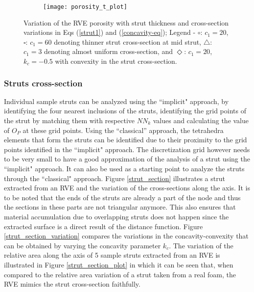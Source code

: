 \begin{figure}
	\centering
	\begin{subfigure}[b]{0.5\textwidth}
		\texttt{[image: porosity\_t\_plot]}
	\end{subfigure}
	\caption{Variation of the RVE porosity with strut thickness and cross-section variations in Eqs (\ref{strut1}) and (\ref{concavity-eq}); Legend - $ \circ $: $ c_1=20 $, $ \square $: $ c_1 = 60 $ denoting thinner strut cross-section at mid strut, $ \triangle $: $c_1 = 3$ denoting almost uniform cross-section, and $ \Diamond $: $ c_1 = 20 $, $ k_c=-0.5 $ with convexity in the strut cross-section.}\label{density_t}
\end{figure}

\subsubsection{Struts cross-section}
Individual sample struts can be analyzed using the ``implicit" approach, by identifying the four nearest inclusions of the struts, identifying the grid points of the strut by matching them with respective $ NN_k $ values and calculating the value of $ O_P $ at these grid points. Using the ``classical'' approach, the tetrahedra elements that form the struts can be identified due to their proximity to the grid points identified in the ``implicit" approach. The discretization grid however needs to be very small to have a good approximation of the analysis of a strut using the ``implicit" approach. It can also be used as a starting point to analyze the struts through the ``classical" approach.  
Figure \ref{strut_section} illustrates a strut extracted from an RVE and the variation of the cross-sections along the axis. It is to be noted that the ends of the struts are already a part of the node and thus the sections in these parts are not triangular anymore.  {This also ensures that material accumulation due to overlapping struts does not happen since the extracted surface is a direct result of the distance function.}  {Figure \ref{strut_section_variation} compares the variations in the concavity-convexity that can be obtained by varying the concavity parameter $ k_c $. 
} 
The variation of the relative area along the axis of 5 sample struts extracted from an RVE is illustrated in Figure \ref{strut_section_plot} in which it can be seen that, when compared to the relative area variation of a strut taken from a real foam, the RVE mimics the strut cross-section faithfully.


